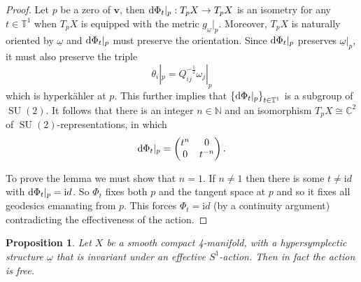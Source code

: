 \documentclass[11pt]{amsart}
\DeclareMathOperator{\SU}{SU}
\newcommand{\C}{\mathbb C}
\newcommand{\N}{\mathbb N}
\newcommand{\id}{\mathrm id}
\def\C{\mathbb{C}}
\def\N{\mathbb{N}}
\newcommand{\diff}{\text{\rm d}}
\theoremstyle{plain}
\newtheorem{proposition}[theorem]{Proposition}
\theoremstyle{definition}
\theoremstyle{plain}
\theoremstyle{definition}
\numberwithin{equation}{section}
\numberwithin{theorem}{section}
\begin{document}
\begin{proof}
    Let $p$ be a zero of $\bm v$, then $\diff \Phi_t|_p: T_p X\to T_p X$ is an isometry for any $t\in \mathbb{T}^1$ when $T_p X$ is equipped with the metric $g_{\underline\omega}|_p$. Moreover, $T_p X$ is naturally oriented by $\underline\omega$ and $\diff\Phi_t|_p$ must preserve the orientation. Since $\diff\Phi_t|_p$ preserves $\underline\omega|_p$, it must also preserve the triple \[\theta_i|_p = Q_{ij}^{-\frac{1}{2}}\omega_j|_p\] 
which is hyperk\"ahler at $p$. This further implies that $\left\{ \diff\Phi_t|_p\right\}_{t\in \mathbb{T}^1}$ is a subgroup of $\SU(2)$. It follows that there is an integer $n \in \N$ and an isomorphism $T_pX \cong \C^2$ of $\SU(2)$-representations, in which
\[
\diff \Phi_t|_p = \begin{pmatrix} t^n & 0 \\ 0 & t^{-n} \end{pmatrix}.
\]

To prove the lemma we must show that $n=1$. If $n \neq 1$ then there is some $t \neq \id$ with $\diff \Phi_t|_p = \id$. So $\Phi_t$ fixes both $p$ and the tangent space at $p$ and so it fixes all geodesics emanating from $p$. This forces $\Phi_t = \id$ (by a continuity argument) contradicting the effectiveness of the action.
%
%
    \end{proof}

\begin{proposition}
Let $X$ be a smooth compact 4-manifold, with a hypersymplectic structure $\underline{\omega}$ that is invariant under an effective $S^1$-action. Then in fact the action is free.
\end{proposition}
\end{document}
